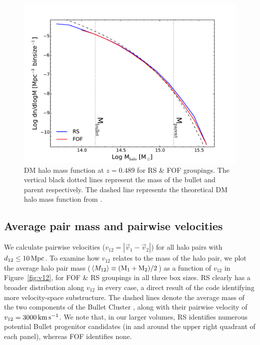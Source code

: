 \documentclass[useAMS, usenatbib]{mn2e}
\newcommand{\Msun}{M_{\odot}}
\newcommand{\vonetwo}{v_{12}}
\newcommand{\kms}{\,\rm{km}\,\rm{s}^{-1}}
\begin{document}
\begin{figure}
\includegraphics[scale=0.45]{figure1.pdf}
\caption{DM halo mass function at $z=0.489$ for RS \& FOF groupings.  The vertical black dotted lines represent the mass of the bullet and parent respectively.  The dashed line represents the theoretical DM halo mass function from \citet{ST99}.}
\label{fig:massfunc}
\end{figure}

\subsection{Average pair mass and pairwise velocities}
 \label{sec:v12}
We calculate pairwise velocities ($\vonetwo = |\vec{v}_1 - \vec{v}_2|$)
for all halo pairs with $d_{12}\leq10\,\rm{Mpc}$.  To examine how
$\vonetwo$ relates to the mass of the halo pair, we plot the average
halo pair mass ($\langle M_{12} \rangle \equiv (\rm{M}_{1}+\rm{M}_{2})/2$)
as a function of $\vonetwo$ in Figure~\ref{fig:v12}, for FOF \& RS
groupings in all three box sizes.  RS clearly has a broader
distribution along $\vonetwo$ in every case, a direct result of the
code identifying more velocity-space substructure.  The dashed lines denote
the average mass of the two components of the Bullet Cluster 
\citep[$8.25\times10^{14}\Msun$;][]{Clowe04,Clowe06,Bradac06},
along with their pairwise velocity
of $\vonetwo=3000\kms$.  We note that, in our larger volumes, 
RS identifies numerous potential
Bullet progenitor candidates (in and around the upper right quadrant 
of each panel), whereas FOF identifies none.
\end{document}
